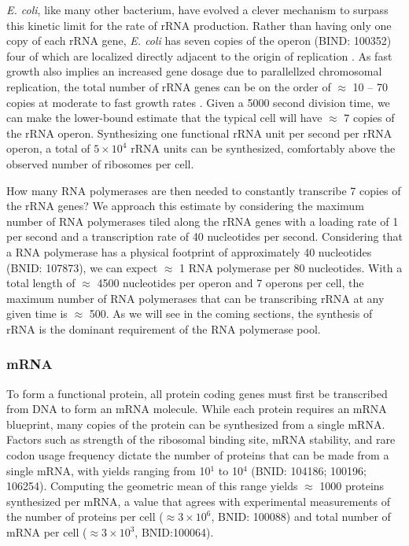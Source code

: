 \textit{E. coli}, like many other bacterium, have evolved a clever mechanism to surpass this kinetic limit
for the rate of rRNA production. Rather than having only one copy of each rRNA
gene, \textit{E. coli} has seven copies of the operon (BIND: 100352) four of which are localized directly adjacent to the origin of
replication \citep{birnbaum1971}. As fast growth also implies an increased gene
dosage due to parallellzed chromosomal replication, the total number of rRNA
genes can be on the order of $\approx$ 10 -- 70 copies at moderate to fast
growth rates \citep{stevenson2004}. Given a 5000
second division time, we can make the lower-bound estimate that the typical cell
will have $\approx$ 7 copies of the rRNA operon. Synthesizing one functional rRNA unit per
second per rRNA operon, a total of $5 \times 10^4$ rRNA units can be
synthesized, comfortably above the observed number of ribosomes per cell.

How many RNA polymerases are then needed to constantly transcribe 7 copies of
the rRNA genes? We approach this estimate by considering the maximum number
of RNA polymerases tiled along the rRNA genes with a loading rate of 1 per
second and a transcription rate of 40 nucleotides per second. Considering
that a RNA polymerase has a physical footprint of approximately 40
nucleotides (BNID: 107873), we can expect
$\approx$ 1 RNA polymerase per 80 nucleotides. With a total length of
$\approx$ 4500 nucleotides per operon and 7 operons per cell, the maximum
number of RNA polymerases that can be transcribing rRNA at any given time is
$\approx$ 500. As we will see in the coming sections, the
synthesis of rRNA is the dominant requirement of the RNA polymerase pool.

\subsubsection{mRNA}
To form a functional protein, all protein coding genes must first be
transcribed from DNA to form an mRNA molecule. While each protein requires an
mRNA blueprint, many copies of the protein can be synthesized from a single
mRNA. Factors such as strength of the ribosomal binding site, mRNA stability,
and rare codon usage frequency dictate the number of proteins that can be
made from a single mRNA, with yields ranging from 10$^1$ to 10$^4$ (BNID: 104186; 100196;
106254). Computing the geometric mean of this range yields
$\approx$ 1000 proteins synthesized per mRNA, a value that agrees with
experimental measurements of the number of proteins per cell ($\approx 3
\times 10^6$, BNID: 100088) and total number of mRNA per
cell ($\approx 3 \times 10^3$, BNID:100064).

